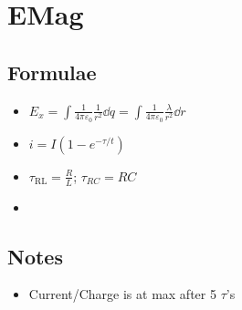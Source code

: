 \documentclass{article}
\begin{document}
  \section{EMag}
  \subsection{Formulae}
  \begin{itemize}
    \item $E_x=\int\frac{1}{4\pi\varepsilon_0}\frac{1}{r^2}\dd q = \int \frac{1}{4\pi\varepsilon_0}\frac{\lambda}{r^2}\dd r$
    \item $i=I(1-e^{-\tau/t})$
    \item $\tau_{\mathrm{RL}}=\frac{R}{L}$; $\tau_{RC}=RC$
    \item 
  \end{itemize}
  \subsection{Notes}
  \begin{itemize}
    \item Current/Charge is at max after 5 $\tau$'s
  \end{itemize}
\end{document}
